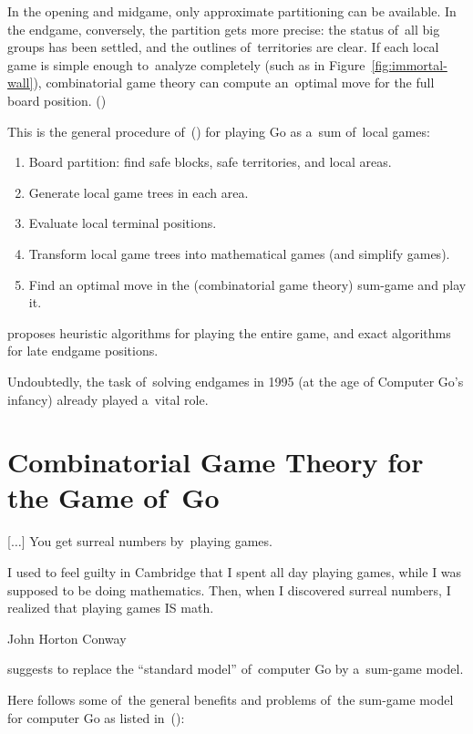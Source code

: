 In the opening and midgame, only approximate partitioning can be available.
In the endgame, conversely, the partition gets more precise:
the status of~all big groups has been settled, and the outlines of~territories are clear.
If each local game is simple enough to~analyze completely (such as in Figure~\ref{fig:immortal-wall}), combinatorial game theory can compute an~optimal move for the full board position.
(\cite{Muller1995computer})

This is the general procedure of~(\cite{Muller1995computer}) for playing Go as a~sum of~local games:
\begin{enumerate}
  \item Board partition: find safe blocks, safe territories, and local areas.
  \item Generate local game trees in each area.
  \item Evaluate local terminal positions.
  \item Transform local game trees into mathematical games (and simplify games).
  \item Find an optimal move in the (combinatorial game theory) sum-game and play it.
\end{enumerate}
\Mueller{} proposes heuristic algorithms for playing the entire game, and exact algorithms for late endgame positions.

Undoubtedly, the task of~solving endgames in 1995 (at the age of Computer Go's infancy) already played a~vital role.

\section{Combinatorial Game Theory for the Game of~Go}

\epigraph{
  [$\dots$]
  You get surreal numbers by~playing games.

  I used to feel guilty in Cambridge that I spent all day playing games, while I was supposed to be doing mathematics.
  Then, when I discovered surreal numbers, I realized that playing games IS math.
}{John Horton Conway}
\Mueller{} suggests to replace the ``standard model'' of~computer Go by a~sum-game model.

Here follows some of~the general benefits and problems of~the sum-game model for computer Go as listed in~(\cite{Muller1995computer}):

\medskip

